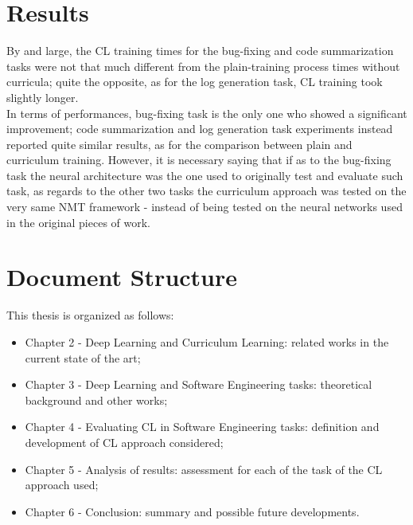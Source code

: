 \section{Results}
By and large, the CL training times for the bug-fixing 
and code summarization tasks were not that much different from
the plain-training process times without curricula; quite the opposite, as for the log generation task, CL training took slightly longer.\\
In terms of performances, bug-fixing task is the only one who showed a significant improvement; code summarization and log generation 
task experiments instead reported quite similar results, as for the comparison between plain and curriculum training.
However, it is necessary saying that if as to the bug-fixing task the neural architecture was the one 
used to originally test and evaluate such task, as regards to the other two tasks 
the curriculum approach was tested on the very same NMT framework - instead of being 
tested on the neural networks used in the original pieces of work.

\section{Document Structure}
This thesis is organized as follows:
\begin{itemize}
    \item Chapter 2 - Deep Learning and Curriculum Learning: related works in the current state of the art;
    \item Chapter 3 - Deep Learning and Software Engineering tasks: theoretical background and other works;
    \item Chapter 4 - Evaluating CL in Software Engineering tasks: definition and development of CL approach considered;
    \item Chapter 5 - Analysis of results: assessment for each of the task of the CL approach used;
    \item Chapter 6 - Conclusion: summary and possible future developments.
\end{itemize}